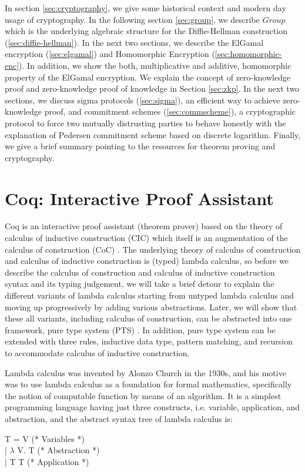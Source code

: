  In section \ref{sec:cryptography}, we give some historical 
 context and modern day usage of cryptography.  In the following section 
 \ref{sec:group}, we describe $Group$ which is the underlying 
 algebraic structure for the Diffie-Hellman construction (\ref{sec:diffie-hellman}). 
 In the next two sections, we describe the ElGamal encryption (\ref{sec:elgamal}) 
 and Homomorphic Encryption (\ref{sec:homomorphic-enc}). In addition, 
 we show the both, multiplicative and additive,  homomorphic property
 of the ElGamal encryption. We explain the concept of zero-knowledge proof 
 and zero-knowledge proof  of knowledge in Section \ref{sec:zkp}. 
 In the next two sections, we discuss sigma protocols (\ref{sec:sigma}), 
 an efficient way to achieve zero-knowledge proof, and commitment schemes
 (\ref{sec:commscheme}), a cryptographic protocol to force two mutually 
 distrusting parties to behave honestly with the explanation of Pedersen 
 commitment scheme based on discrete logarithm.  Finally, we give a 
 brief summary pointing to the resources for theorem proving and 
 cryptography. 
 


\section{Coq: Interactive Proof Assistant}
\label{sec:problemstatement}
Coq  is an interactive proof assistant (theorem prover) based on
the theory of calculus of 
inductive construction (CIC) \citep{Paulin-Mohring:1993:IDS:645891.671440} which itself is an 
augmentation of the calculus of construction (CoC) 
\citep{Coquand:1988:CC:47724.47725}.  
The underlying theory of calculus of construction and calculus of 
inductive construction is (typed) lambda calculus, so 
before we describe the calculus of construction and calculus of inductive 
construction syntax and its typing judgement, 
we will take a brief detour to explain the
different variants of lambda calculus starting from 
untyped lambda calculus and moving up progressively by 
adding various abstractions. Later, we will show that 
these all variants, including calculus of construction, can be abstracted into one 
framework,  pure type system (PTS) \citep{berardi1988towards} 
\citep{Barendregt:1993:LCT:162552.162561}.  
In addition, 
pure type system can be extended with three rules, 
inductive data type, pattern matching, and recursion 
to accommodate calculus of inductive construction.

Lambda calculus was invented by Alonzo Church in the 1930s, 
and his motive was to use lambda calculus as a foundation 
for formal mathematics, specifically the notion of 
computable function by means of an algorithm.  
It is a simplest programming language having just 
three constructs, i.e. variable, application, and abstraction, 
and the abstract syntax tree of lambda calculus is:
\begin{displayquote}

T = V (* Variables *) \\
   | $\lambda$ V. T (* Abstraction *) \\
   | T T       (* Application *)

\end{displayquote}

